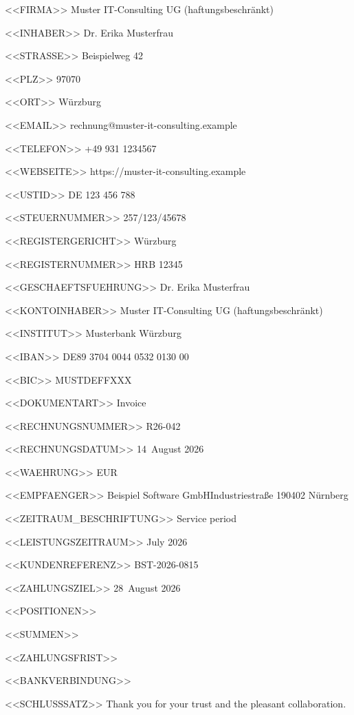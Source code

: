 <<FIRMA>>
Muster IT-Consulting UG (haftungsbeschränkt)

<<INHABER>>
Dr. Erika Musterfrau

<<STRASSE>>
Beispielweg 42

<<PLZ>>
97070

<<ORT>>
Würzburg

<<EMAIL>>
rechnung@muster-it-consulting.example

<<TELEFON>>
+49 931 1234567

<<WEBSEITE>>
https://muster-it-consulting.example

<<USTID>>
DE 123 456 788

<<STEUERNUMMER>>
257/123/45678

<<REGISTERGERICHT>>
Würzburg

<<REGISTERNUMMER>>
HRB 12345

<<GESCHAEFTSFUEHRUNG>>
Dr. Erika Musterfrau

<<KONTOINHABER>>
Muster IT-Consulting UG (haftungsbeschränkt)

<<INSTITUT>>
Musterbank Würzburg

<<IBAN>>
DE89 3704 0044 0532 0130 00

<<BIC>>
MUSTDEFFXXX

<<DOKUMENTART>>
Invoice

<<RECHNUNGSNUMMER>>
R26-042

<<RECHNUNGSDATUM>>
14~August 2026

<<WAEHRUNG>>
EUR

<<EMPFAENGER>>
Beispiel Software GmbH\zeilenwechsel{}Industriestraße 1\zeilenwechsel{}90402 Nürnberg

<<ZEITRAUM_BESCHRIFTUNG>>
Service period

<<LEISTUNGSZEITRAUM>>
July 2026

<<KUNDENREFERENZ>>
BST-2026-0815

<<ZAHLUNGSZIEL>>
28~August 2026

<<POSITIONEN>>
 \positionstrenner{}

<<SUMMEN>>
   \summentrenner{}

<<ZAHLUNGSFRIST>>

<<BANKVERBINDUNG>>
\bankblock{}

<<SCHLUSSSATZ>>
Thank you for your trust and the pleasant collaboration.
